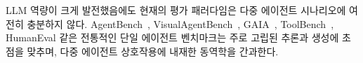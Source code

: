 LLM 역량이 크게 발전했음에도 현재의 평가 패러다임은 다중 에이전트 시나리오에 여전히 충분하지 않다. AgentBench~\citep{liu2023agentbench}, VisualAgentBench~\citep{Sun2023VisualAgentBench}, GAIA~\citep{mialon2023gaia}, ToolBench~\citep{qin2024toolllm}, HumanEval \citep{Chen2021Evaluating} 같은 전통적인 단일 에이전트 벤치마크는 주로 고립된 추론과 생성에 초점을 맞추며, 다중 에이전트 상호작용에 내재한 동역학을 간과한다.


